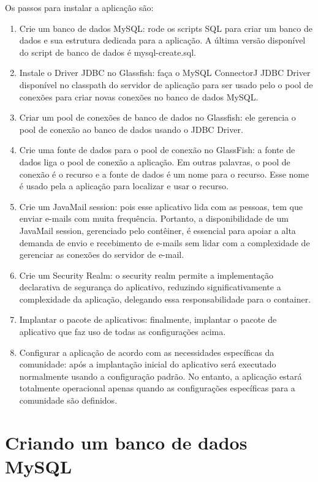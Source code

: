 \documentclass[envcountsame,envcountchap]{svmono}
\begin{document}
Os passos para instalar a aplicação são:

\begin{enumerate}
\item Crie um banco de dados MySQL: rode os scripts SQL para criar um banco de dados e sua estrutura dedicada para a aplicação. A última versão disponível do script de banco de dados é mysql-create.sql.
\item Instale o Driver JDBC no Glassfish: faça o MySQL ConnectorJ JDBC Driver disponível no classpath do servidor de aplicação para ser usado pelo o pool de conexões para criar novas conexões no banco de dados MySQL.
\item Criar um pool de conexões de banco de dados no Glassfish: ele gerencia o pool de conexão ao banco de dados usando o JDBC Driver.
\item Crie uma fonte de dados para o pool de conexão no GlassFish: a fonte de dados liga o pool de conexão a aplicação. Em outras palavras, o pool de conexão é o recurso e a fonte de dados é um nome para o recurso. Esse nome é usado pela a aplicação para localizar e usar o recurso.

\item Crie um JavaMail session: pois esse aplicativo lida com as pessoas, tem que enviar e-mails com muita frequência. Portanto, a disponibilidade de um JavaMail session, gerenciado pelo contêiner, é essencial para apoiar a alta demanda de envio e recebimento de e-mails sem lidar com a complexidade de gerenciar as conexões do servidor de e-mail.
\item Crie um Security Realm: o security realm permite a implementação declarativa de segurança do aplicativo, reduzindo significativamente a complexidade da aplicação, delegando essa responsabilidade para o container.
\item Implantar o pacote de aplicativos: finalmente, implantar o pacote de aplicativo que faz uso de todas as configurações acima.
\item Configurar a aplicação de acordo com as necessidades específicas da comunidade: após a implantação inicial do aplicativo será executado normalmente usando a configuração padrão. No entanto, a aplicação estará totalmente operacional apenas quando as configurações específicas para a comunidade são definidos.
\end{enumerate}

\section{Criando um banco de dados MySQL}
\end{document}
